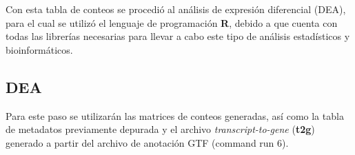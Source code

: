 \documentclass[
  9pt,
]{article}
\begin{document}
\begin{table}[htbp]
\centering
\scriptsize
{}
\caption{Matriz de conteos hisat2 limpia y con los nombres de las muestras srr asignados}
\end{table}

Con esta tabla de conteos se procedió al análisis de expresión
diferencial (DEA), para el cual se utilizó el lenguaje de programación
\textbf{R}, debido a que cuenta con todas las librerías necesarias para
llevar a cabo este tipo de análisis estadísticos y bioinformáticos.

\subsection{DEA}\label{dea}

Para este paso se utilizarán las matrices de conteos generadas, así como
la tabla de metadatos previamente depurada y el archivo
\emph{transcript-to-gene} (\textbf{t2g}) generado a partir del archivo
de anotación GTF (command run 6).
\end{document}
